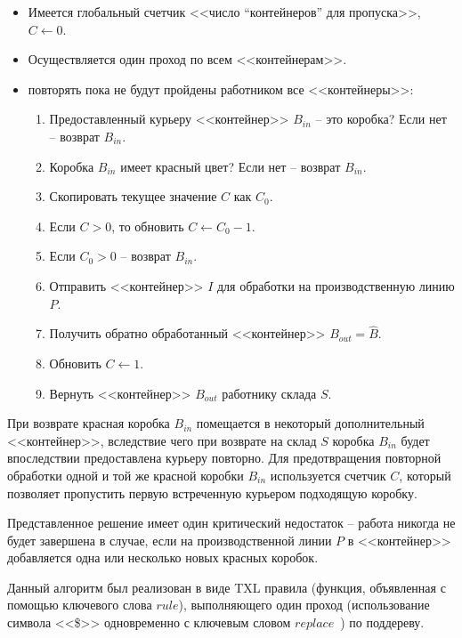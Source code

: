 \begin{itemize}[noitemsep]
  \item Имеется глобальный счетчик <<число ``контейнеров'' для пропуска>>, $C \leftarrow 0$.
  \item Осуществляется один проход по всем <<контейнерам>>.

  \item повторять пока не будут пройдены работником все <<контейнеры>>:
    \begin{enumerate}[noitemsep]
      \item Предоставленный курьеру <<контейнер>> $B_{in}$ -- это коробка? Если нет -- возврат $B_{in}$.
      \item Коробка $B_{in}$ имеет красный цвет? Если нет -- возврат $B_{in}$.
      \item Скопировать текущее значение $C$ как $C_0$.
      \item Если $C > 0$, то обновить $C \leftarrow C_0 - 1$.
      \item Если $C_0 > 0$ -- возврат $B_{in}$.
      \item Отправить <<контейнер>> $I$ для обработки на производственную линию $P$.
      \item Получить обратно обработанный <<контейнер>> $B_{out} = \hat{B}$.
      \item Обновить $C \leftarrow 1$.
      \item Вернуть <<контейнер>> $B_{out}$ работнику склада $S$.
    \end{enumerate}
\end{itemize}

При возврате красная коробка $B_{in}$ помещается в некоторый дополнительный <<контейнер>>, вследствие чего при возврате на склад $S$ коробка $B_{in}$ будет впоследствии предоставлена курьеру повторно.
Для предотвращения повторной обработки одной и той же красной коробки $B_{in}$ используется счетчик $C$, который позволяет пропустить первую встреченную курьером подходящую коробку.

Представленное решение имеет один критический недостаток -- работа никогда не будет завершена в случае, если на производственной линии $P$ в <<контейнер>> добавляется одна или несколько новых красных коробок.

Данный алгоритм был реализован в виде TXL правила (функция, объявленная с помощью ключевого слова $rule$), выполняющего один проход (использование символа <<\$>> одновременно с ключевым словом $replace$~\cite{txl-book}) по поддереву.

